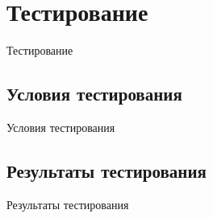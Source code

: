 \section{Тестирование}
Тестирование

\subsection{Условия тестирования}
Условия тестирования

\subsection{Результаты тестирования}
Результаты тестирования

\newpage